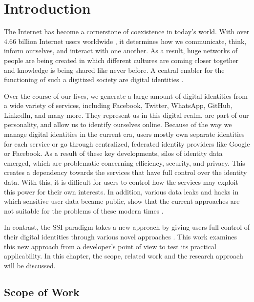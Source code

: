 \chapter{Introduction}\label{chapter: Introduction}
	The Internet has become a cornerstone of coexistence in today's world. With over 4.66 billion Internet users worldwide \cite{johnson_internet_2021}, it determines how we communicate, think, inform ourselves, and interact with one another. As a result, huge networks of people are being created in which different cultures are coming closer together and knowledge is being shared like never before. A central enabler for the functioning of such a digitized society are digital identities \cite{liu_blockchain-based_2020}.
	
	Over the course of our lives, we generate a large amount of digital identities from a wide variety of services, including Facebook, Twitter, WhatsApp, GitHub, LinkedIn, and many more. They represent us in this digital realm, are part of our personality, and allow us to identify ourselves online. Because of the way we manage digital identities in the current era, users mostly own separate identities for each service or go through centralized, federated identity providers like Google or Facebook. As a result of these key developments, silos of identity data emerged, which are problematic concerning efficiency, security, and privacy. This creates a dependency towards the services that have full control over the identity data. With this, it is difficult for users to control how the services may exploit this power for their own interests. In addition, various data leaks and hacks in which sensitive user data became public, show that the current approaches are not suitable for the problems of these modern times \cite{swinhoe_15_2021}. \cite[pp. 2-3]{ehrlich_self-sovereign_2021}
	
	In contrast, the \ac{SSI} paradigm takes a new approach by giving users full control of their digital identities through various novel approaches \cite[p. 103059]{ferdous_search_2019}. This work examines this new approach from a developer's point of view to test its practical applicability. In this chapter, the scope, related work and the research approach will be discussed.
	
	\section{Scope of Work}\label{section: Scope of Work} %
	
